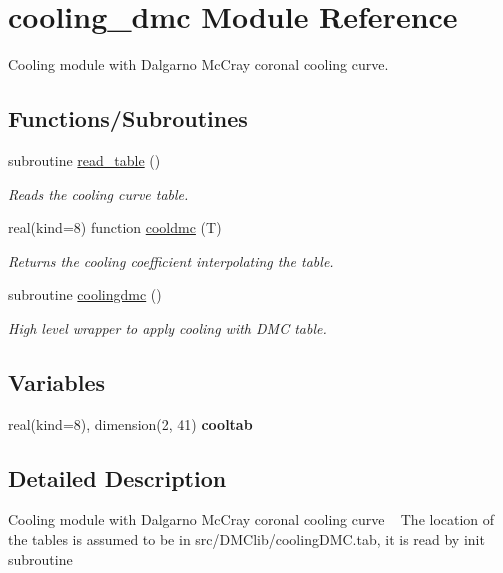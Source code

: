 \hypertarget{namespacecooling__dmc}{}\section{cooling\+\_\+dmc Module Reference}
\label{namespacecooling__dmc}


Cooling module with Dalgarno Mc\+Cray coronal cooling curve.  


\subsection*{Functions/\+Subroutines}
\begin{DoxyCompactItemize}
\item 
subroutine \hyperlink{namespacecooling__dmc_a7874b4f8a76399e87e0a22aecd088cf8}{read\+\_\+table} ()
\begin{DoxyCompactList}\small\item\em Reads the cooling curve table. \end{DoxyCompactList}\item 
real(kind=8) function \hyperlink{namespacecooling__dmc_af987bbf144f596d57b154427bbb82ae5}{cooldmc} (T)
\begin{DoxyCompactList}\small\item\em Returns the cooling coefficient interpolating the table. \end{DoxyCompactList}\item 
subroutine \hyperlink{namespacecooling__dmc_a7af28062f0cd20c4bb0d86c895f4a8d6}{coolingdmc} ()
\begin{DoxyCompactList}\small\item\em High level wrapper to apply cooling with D\+M\+C table. \end{DoxyCompactList}\end{DoxyCompactItemize}
\subsection*{Variables}
\begin{DoxyCompactItemize}
\item 
\hypertarget{namespacecooling__dmc_aa692bc7125c6e889f3cf993f9f48f9d3}{}real(kind=8), dimension(2, 41) {\bfseries cooltab}\label{namespacecooling__dmc_aa692bc7125c6e889f3cf993f9f48f9d3}

\end{DoxyCompactItemize}


\subsection{Detailed Description}
Cooling module with Dalgarno Mc\+Cray coronal cooling curve ~\newline
 The location of the tables is assumed to be in src/\+D\+M\+Clib/cooling\+D\+M\+C.\+tab, it is read by init subroutine 

